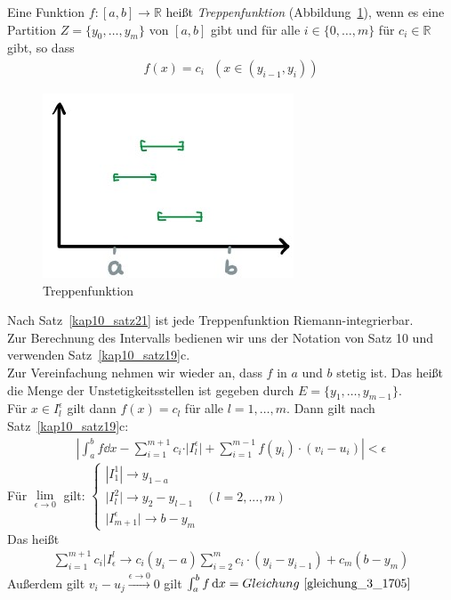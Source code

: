 \begin{Definition}{
	Eine Funktion $f: [a,b] \rightarrow \mathbb{R}$ heißt \emph{Treppenfunktion}
	 (Abbildung~\ref{plot_treppenfkt}), 
	wenn es 
	eine Partition $Z = \{ y_0, \hdots, y_m \}$ von $[a,b]$ gibt und für alle 
	$i \in \{0, \hdots, m\}$ für $c_i \in \mathbb{R}$ gibt, so dass 
	\begin{align*}
		f(x) = c_i \text{ } ( x\in (y_{i-1},y_i))
	\end{align*}
	\begin{figure}
		\begin{center}
			\includegraphics[scale=0.5]{Skizzen/plot_treppenfkt}
		\end{center}
		\caption{Treppenfunktion}
		\label{plot_treppenfkt}
	\end{figure}
	Nach Satz~\ref{kap10_satz21}
	ist jede Treppenfunktion Riemann-integrierbar. \\
	Zur Berechnung des Intervalls bedienen wir uns der Notation von Satz 10 
	und verwenden Satz~\ref{kap10_satz19}c.\\
	Zur Vereinfachung nehmen wir wieder an, dass $f$ in $a$ und $b$ stetig ist. 
	Das heißt die Menge der Unstetigkeitsstellen ist gegeben durch 
	$E = \{y_1, \hdots, y_{m-1}\}$. \\
	Für $x \in I_l^{\epsilon}$ gilt dann $f(x) = c_l$ für alle $ l = 1, \hdots, m$.
	Dann gilt nach Satz~\ref{kap10_satz19}c:
	\begin{align*}
		\left\vert \int_a^b f \dd{x} - \sum_{i=1}^{m+1} c_i \cdot \vert 
		I_l^{\epsilon}\vert + \sum_{i =1}^{m-1} f(y_i)\cdot (v_i -u_i) \right\vert
		< \epsilon
	\end{align*}
	Für $ \lim\limits_{\epsilon \rightarrow 0}{}$ gilt:
	$\begin{cases} 
		|I_1^1| \rightarrow y_{1-a} & \\
		\vert I_l^2 \vert \rightarrow y_2 - y_{l-1} & ( l = 2,...,m) \\
		\vert I_{m+1}^{\epsilon} \vert \rightarrow b - y_m &
	\end{cases}$ \\
	Das heißt
	\begin{align}
		\label{gleichung_3_1705}
		\sum_{i=1}^{m+1}c_i\vert I_{\epsilon}^l \rightarrow c_i(y_i -a) 
		\sum_{i=2}^m c_i \cdot (y_i -y_{i-1}) + c_m(b-y_m)
	\end{align}
	Außerdem gilt $v_i-u_j \overset{\epsilon \rightarrow 0}{\rightarrow} 0$
	gilt $\int_a^b f\dd{x} = Gleichung~\ref{gleichung_3_1705}$
	
}\end{Definition}